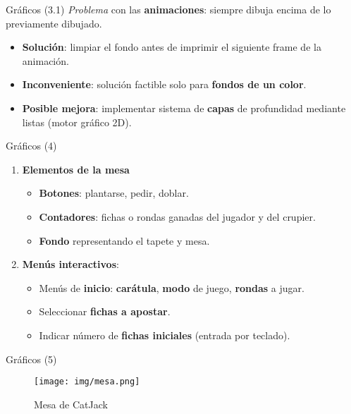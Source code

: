 
\begin{frame}{Gráficos (3.1)}
    \textit{Problema} con las \textbf{animaciones}: siempre dibuja encima de lo previamente dibujado.
    \begin{itemize}
        \item \textbf{Solución}: limpiar el fondo antes de imprimir el siguiente frame de la animación.
        \item \textbf{Inconveniente}: solución factible solo para \textbf{fondos de un color}.
        \item \textbf{Posible mejora}: implementar sistema de \textbf{capas} de profundidad mediante listas (motor gráfico 2D).
    \end{itemize}
\end{frame}


\begin{frame}{Gráficos (4)}
    \begin{enumerate}[4]
        \item \textbf{Elementos de la mesa}
        \begin{itemize}
            \item \textbf{Botones}: plantarse, pedir, doblar.
            \item \textbf{Contadores}: fichas o rondas ganadas del jugador y del crupier.
            \item \textbf{Fondo} representando el tapete y mesa.
        \end{itemize}
        \item \textbf{Menús interactivos}:
        \begin{itemize}
            \item Menús de \textbf{inicio}: \textbf{carátula}, \textbf{modo} de juego, \textbf{rondas} a jugar.
            \item Seleccionar \textbf{fichas a apostar}.
            \item Indicar número de \textbf{fichas iniciales} (entrada por teclado). 
        \end{itemize}
    \end{enumerate}
\end{frame}


\begin{frame}{Gráficos (5)}
    \begin{figure}
        \centering
        \texttt{[image: img/mesa.png]}
        \caption{Mesa de CatJack}
        \label{fig:enter-label}
    \end{figure}
\end{frame}

